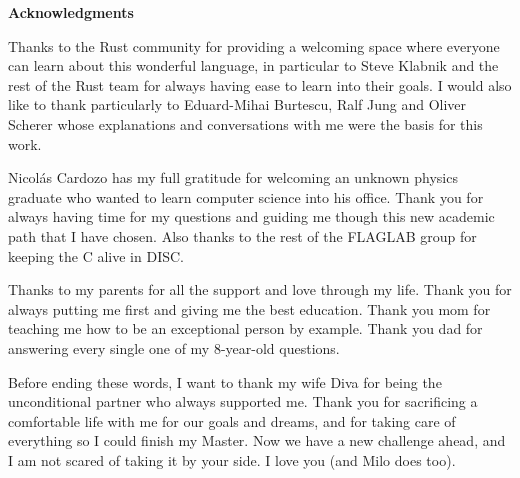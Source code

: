 \clearemptydoublepage
{}
{}

\vspace*{2cm}

\begin{center}
{\Large \textbf{Acknowledgments}}
\end{center}

\vspace{1cm}

Thanks to the Rust community for providing a welcoming space where everyone can
learn about this wonderful language, in particular to Steve Klabnik and the
rest of the Rust team for always having ease to learn into their goals. I would
also like to thank particularly to Eduard-Mihai Burtescu, Ralf Jung and Oliver
Scherer whose explanations and conversations with me were the basis for this
work.

Nicolás Cardozo has my full gratitude for welcoming an unknown physics graduate
who wanted to learn computer science into his office. Thank you for always
having time for my questions and guiding me though this new academic path that
I have chosen. Also thanks to the rest of the FLAGLAB group for keeping the C
alive in DISC.

Thanks to my parents for all the support and love through my life. Thank you
for always putting me first and giving me the best education. Thank you mom for
teaching me how to be an exceptional person by example. Thank you dad for
answering every single one of my 8-year-old questions.

Before ending these words, I want to thank my wife Diva for being the
unconditional partner who always supported me. Thank you for sacrificing a
comfortable life with me for our goals and dreams, and for taking care of
everything so I could finish my Master. Now we have a new challenge ahead, and
I am not scared of taking it by your side. I love you (and Milo does too).
